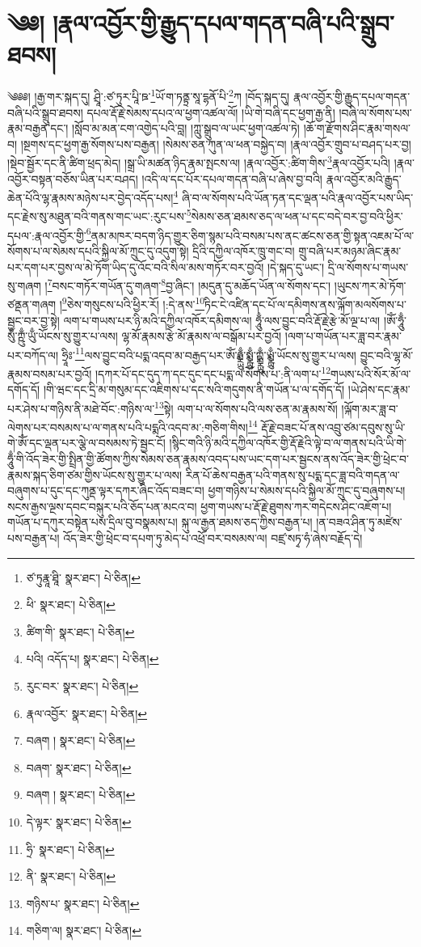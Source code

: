 \setcounter{footnote}{0} 
\chapter{༄༅། །རྣལ་འབྱོར་གྱི་རྒྱུད་དཔལ་གདན་བཞི་པའི་སྒྲུབ་ཐབས།}༄༅༅། །རྒྱ་གར་སྐད་དུ། ཤྲཱི་:ཙ་ཏུར་པཱི་ཋ་\footnote{ཙ་ཏུརྣཱ་ཐཱི་  སྣར་ཐང་།  པེ་ཅིན། }ཡོ་ག་ཏནྟྲ་སཱ་དྷནོ་པི་\footnote{ཕི་  སྣར་ཐང་།  པེ་ཅིན། }ཀ །བོད་སྐད་དུ། རྣལ་འབྱོར་གྱི་རྒྱུད་དཔལ་གདན་བཞི་པའི་སྒྲུབ་ཐབས། དཔལ་རྡོ་རྗེ་སེམས་དཔའ་ལ་ཕྱག་འཚལ་ལོ། །ཡི་གེ་བཞི་དང་ཕྱག་རྒྱ་ནི། །བཞི་ལ་སོགས་པས་རྣམ་བརྒྱན་དང་། །སློབ་མ་མན་ངག་འགྱེད་པའི་བླ། །ཀླུ་སྒྲུབ་ལ་ཡང་ཕྱག་འཚལ་ཏེ། །ཆོ་ག་རྫོགས་ཤིང་རྣམ་གསལ་བ། །སྔགས་དང་ཕྱག་རྒྱ་སོགས་པས་བརྒྱན། །སེམས་ཅན་ཀུན་ལ་ཕན་བསྐྱེད་བ། །རྣལ་འབྱོར་གྲུབ་པ་བཤད་པར་བྱ། །སྡེབ་སྦྱོར་དང་ནི་ཚིག་ཕྲད་མེད། །སྒྲ་ཡི་མཚན་ཉིད་རྣམ་སྤངས་ལ། །རྣལ་འབྱོར་:ཚིག་གིས་\footnote{ཚིག་གི་  སྣར་ཐང་།  པེ་ཅིན། }རྣལ་འབྱོར་པའི། །རྣལ་འབྱོར་བསྟན་བཅོས་ཡིན་པར་བཤད། །འདི་ལ་དང་པོར་དཔལ་གདན་བཞི་པ་ཞེས་བྱ་བའི། རྣལ་འབྱོར་མའི་རྒྱུད་ཆེན་པོའི་ལྷ་རྣམས་མཉེས་པར་བྱེད་འདོད་པས།\footnote{པའི། འདོད་པ།  སྣར་ཐང་།  པེ་ཅིན། } ཞི་བ་ལ་སོགས་པའི་ཡོན་ཏན་དང་ལྡན་པའི་རྣལ་འབྱོར་པས་ཡིད་དང་རྗེས་སུ་མཐུན་བའི་གནས་གང་ཡང་:རུང་པས་\footnote{རུང་བར་  སྣར་ཐང་།  པེ་ཅིན། }སེམས་ཅན་ཐམས་ཅད་ལ་ཕན་པ་དང་བདེ་བར་བྱ་བའི་ཕྱིར་དཔལ་:རྣལ་འབྱོར་གྱི་\footnote{རྣལ་འབྱོར་  སྣར་ཐང་།  པེ་ཅིན། }ནམ་མཁར་བདག་ཉིད་གྱུར་ཅིག་སྙམ་པའི་བསམ་པས་ནང་ཚངས་ཅན་གྱི་སྟན་འཇམ་པོ་ལ་སོགས་པ་ལ་སེམས་དཔའི་སྐྱིལ་མོ་ཀྲུང་དུ་འདུག་སྟེ། དྲིའི་དཀྱིལ་འཁོར་ཁྲུ་གང་བ། གྲུ་བཞི་པར་མཉམ་ཞིང་རྣམ་པར་དག་པར་བྱས་ལ་མེ་ཏོག་ཡིད་དུ་འོང་བའི་སིལ་མས་གཏོར་བར་བྱའོ། །དེ་སྐད་དུ་ཡང་། དྲི་ལ་སོགས་པ་གཡས་སུ་གཞག །\footnote{བཞག །  སྣར་ཐང་།  པེ་ཅིན། }བསང་གཏོར་གཡོན་དུ་གཞག་\footnote{བཞག་  སྣར་ཐང་།  པེ་ཅིན། }བྱ་ཞིང་། །མདུན་དུ་མཆོད་ཡོན་ལ་སོགས་དང་། །ཡུངས་ཀར་མེ་ཏོག་ཙནྡན་གཞག །\footnote{བཞག །  སྣར་ཐང་།  པེ་ཅིན། }ཅེས་གསུངས་པའི་ཕྱིར་རོ། །:དེ་ནས་\footnote{དེ་ལྟར་  སྣར་ཐང་།  པེ་ཅིན། }ཏིང་ངེ་འཛིན་དང་པོ་ལ་དམིགས་ནས་ལྐོག་མལསོགས་པ་སྦྱང་བར་བྱ་སྟེ། ལག་པ་གཡས་པར་ཉི་མའི་དཀྱིལ་འཁོར་དམིགས་ལ། ཧཱུྃ་ལས་བྱུང་བའི་རྡོ་རྗེ་རྩེ་མོ་ལྔ་པ་ལ། །ཨོཾ་ཧཱུྃ་སུྃ་ཀྵུྃ་ཡུྃ་ཡོངས་སུ་གྱུར་པ་ལས། ལྷ་མོ་རྣམས་རྩེ་མོ་རྣམས་ལ་བསྒོམ་པར་བྱའོ། །ལག་པ་གཡོན་པར་ཟླ་བར་རྣམ་པར་བཀོད་ལ། ཧྲཱིཿ་\footnote{ཧྲི་  སྣར་ཐང་།  པེ་ཅིན། }ལས་བྱུང་བའི་པདྨ་འདབ་མ་བརྒྱད་པར་ཨོཾ་ཧྨྼྻུྃ་སྨྼྻུྃ་ཀྵྨྼྻུྃ་ཡྨྼྻུྃ་ཡོངས་སུ་གྱུར་པ་ལས། བྱུང་བའི་ལྷ་མོ་རྣམས་བསམ་པར་བྱའོ། །དཀར་པོ་དང་དུད་ཀ་དང་དུང་དང་པདྨ་ལ་སོགས་པ་:ནི་ལག་པ་\footnote{ནི་  སྣར་ཐང་།  པེ་ཅིན། }གཡས་པའི་སོར་མོ་ལ་དགོད་དོ། །གི་ཝང་དང་དྲི་མ་གསུམ་དང་འཇིགས་པ་དང་སའི་གདུགས་ནི་གཡོན་པ་ལ་དགོད་དོ། །ཡེ་ཤེས་དང་རྣམ་པར་ཤེས་པ་གཉིས་ནི་མཐེ་བོང་:གཉིས་ལ་\footnote{གཉིས་པ་  སྣར་ཐང་།  པེ་ཅིན། }སྟེ། ལག་པ་ལ་སོགས་པའི་ལས་ཅན་མ་རྣམས་སོ། །ལྐོག་མར་ཟླ་བ་ལེགས་པར་བསམས་པ་ལ་གནས་པའི་པདྨའི་འདབ་མ་:གཅིག་གིས།\footnote{གཅིག་ལ།  སྣར་ཐང་།  པེ་ཅིན། } རྡོ་རྗེ་བཟང་པོ་ནས་འབྲུ་ཙམ་དབུས་སུ་ཡི་གེ་ཨོཾ་དང་ལྡན་པར་ལྕེ་ལ་བསམས་ཏེ་སྦྱང་ངོ། །སྙིང་གའི་ཉི་མའི་དཀྱིལ་འཁོར་གྱི་རྡོ་རྗེའི་ལྟེ་བ་ལ་གནས་པའི་ཡི་གེ་ཧཱུྃ་གི་འོད་ཟེར་གྱི་སྤྲིན་གྱི་ཚོགས་ཀྱིས་སེམས་ཅན་རྣམས་འབད་པས་ཡང་དག་པར་སྦྱངས་ནས་འོད་ཟེར་གྱི་ཕྲེང་བ་རྣམས་སྐད་ཅིག་ཙམ་གྱིས་ཡོངས་སུ་གྱུར་པ་ལས། རིན་པོ་ཆེས་བརྒྱན་པའི་གནས་སུ་པདྨ་དང་ཟླ་བའི་གདན་ལ་བཞུགས་པ་དུང་དང་ཀུནྡ་ལྟར་དཀར་ཞིང་འོད་བཟང་བ། ཕྱག་གཉིས་པ་སེམས་དཔའི་སྐྱིལ་མོ་ཀྲུང་དུ་བཞུགས་པ། སངས་རྒྱས་ལྔས་དབང་བསྐུར་པའི་ཅོད་པན་མངའ་བ། ཕྱག་གཡས་པ་རྡོ་རྗེ་ཐུགས་ཀར་གདེངས་ཤིང་འཇོག་པ། གཡོན་པ་དཀུར་བསྟེན་པས་དྲིལ་བུ་བསྣམས་པ། སྐུ་ལ་རྒྱན་ཐམས་ཅད་ཀྱིས་བརྒྱན་པ། །ན་བཟའ་ཤིན་ཏུ་མཛེས་པས་བརྒྱན་པ། འོད་ཟེར་གྱི་ཕྲེང་བ་དཔག་ཏུ་མེད་པ་འཕྲོ་བར་བསམས་ལ། བཛྲ་སཏྭ་ཧཾ་ཞེས་བརྗོད་དེ། 